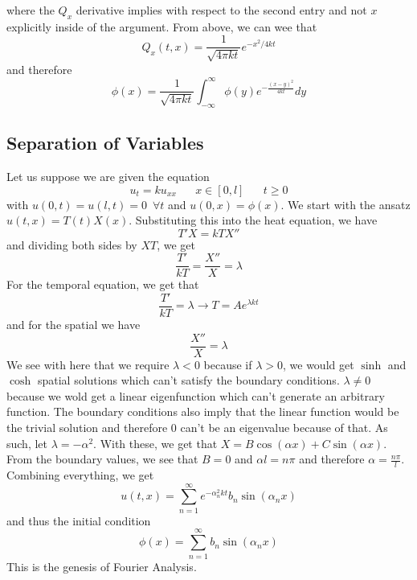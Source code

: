 \documentclass{article}
\newcommand{\twen}{\hspace{20pt}}
\theoremstyle{definition}
\begin{document}
where the $Q_x$ derivative implies with respect to the second entry and not $x$ explicitly inside of the argument. From above, we can wee that 
\begin{equation*}
    Q_x(t,x) = \frac{1}{\sqrt {4\pi kt}}e^{-x^2/4kt}
\end{equation*}
and therefore 
\begin{equation*}
    \phi (x)=\frac{1}{\sqrt{4\pi kt}}\int^\infty_{-\infty} \phi(y)e^{-\frac{(x-y)^2}{4kt}}dy
\end{equation*}
\subsection{Separation of Variables}
Let us suppose we are given the equation 
\begin{equation*}
    u_t=ku_{xx} \twen x\in [0,l] \twen t\geq 0
\end{equation*}
with $u(0,t)=u(l,t)=0 \,\,\, \forall t$ and $u(0,x)=\phi(x)$. We start with the ansatz $u(t,x)=T(t)X(x)$. Substituting this into the heat equation, we have 
\begin{equation*}
    T'X=kTX'' 
\end{equation*}
and dividing both sides by $XT$, we get 
\begin{equation*}
    \frac{T'}{kT} = \frac{X''}{X} = \lambda
\end{equation*}
For the temporal equation, we get that 
\begin{equation*}
    \frac{T'}{kT}=\lambda \to T=Ae^{\lambda kt}
\end{equation*}
and for the spatial we have 
\begin{equation*}
    \frac{X''}{X}=\lambda
\end{equation*}
We see with here that we require $\lambda <0$ because if $\lambda >0$, we would get $\sinh$ and $\cosh$ spatial solutions which can't satisfy the boundary conditions. $\lambda \neq 0$ because we wold get a linear eigenfunction which can't generate an arbitrary function. The boundary conditions also imply that the linear function would be the trivial solution and therefore 0 can't be an eigenvalue because of that. As such, let $\lambda = -\alpha^2$. With these, we get that $X=B\cos(\alpha x)+C\sin(\alpha x)$. From the boundary values, we see that $B=0$ and $\alpha l = n\pi$ and therefore $\alpha = \frac{n\pi}{l}$. Combining everything, we get 
\begin{equation*}
    u(t,x)=\sum^\infty_{n=1}e^{-\alpha_n^2kt}b_n\sin(\alpha_nx)
\end{equation*}
and thus the initial condition 
\begin{equation*}
    \phi(x) = \sum^\infty_{n=1}b_n\sin (\alpha_nx)
\end{equation*}
This is the genesis of Fourier Analysis.
\end{document}

